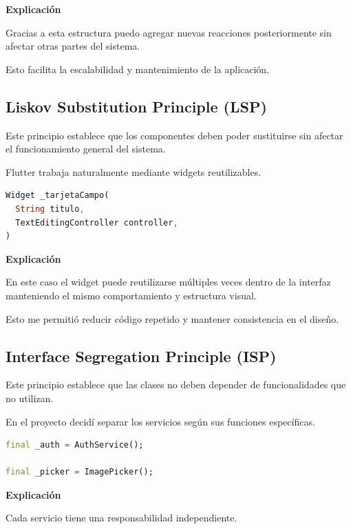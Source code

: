 \documentclass[12pt]{article}
\begin{document}
\textbf{Explicación}

Gracias a esta estructura puedo agregar nuevas reacciones posteriormente sin afectar otras partes del sistema.

Esto facilita la escalabilidad y mantenimiento de la aplicación.


\subsection{Liskov Substitution Principle (LSP)}

Este principio establece que los componentes deben poder sustituirse sin afectar el funcionamiento general del sistema.

Flutter trabaja naturalmente mediante widgets reutilizables.

\begin{lstlisting}[language=Dart]
Widget _tarjetaCampo(
  String titulo,
  TextEditingController controller,
)
\end{lstlisting}

\textbf{Explicación}

En este caso el widget puede reutilizarse múltiples veces dentro de la interfaz manteniendo el mismo comportamiento y estructura visual.

Esto me permitió reducir código repetido y mantener consistencia en el diseño.


\subsection{Interface Segregation Principle (ISP)}

Este principio establece que las clases no deben depender de funcionalidades que no utilizan.

En el proyecto decidí separar los servicios según sus funciones específicas.

\begin{lstlisting}[language=Dart]
final _auth = AuthService();

final _picker = ImagePicker();
\end{lstlisting}

\textbf{Explicación}

Cada servicio tiene una responsabilidad independiente.
\end{document}
